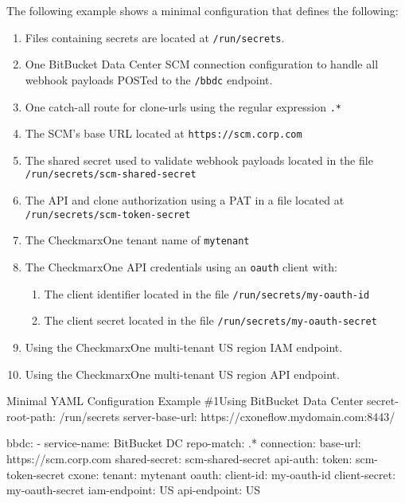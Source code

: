 The following example shows a minimal \cxoneflow configuration that defines the following:

\begin{enumerate}
    \item Files containing secrets are located at \texttt{/run/secrets}.
    \item One BitBucket Data Center SCM connection configuration to handle all webhook payloads
    POSTed to the \texttt{/bbdc} endpoint.
    \item One catch-all route for clone-urls using the regular expression \texttt{.*}
    \item The SCM's base URL located at \texttt{https://scm.corp.com}
    \item The shared secret used to validate webhook payloads located in the file \texttt{/run/secrets/scm-shared-secret}
    \item The API and clone authorization using a PAT in a file located at \texttt{/run/secrets/scm-token-secret}
    \item The CheckmarxOne tenant name of \texttt{mytenant}
    \item The CheckmarxOne API credentials using an \texttt{oauth} client with:
    \begin{enumerate}
        \item The client identifier located in the file \texttt{/run/secrets/my-oauth-id}
        \item The client secret located in the file \texttt{/run/secrets/my-oauth-secret}
    \end{enumerate}
    \item Using the CheckmarxOne multi-tenant US region IAM endpoint.
    \item Using the CheckmarxOne multi-tenant US region API endpoint.
\end{enumerate}

\begin{code}{Minimal YAML Configuration Example \#1}{Using BitBucket Data Center}{}
secret-root-path: /run/secrets
server-base-url: https://cxoneflow.mydomain.com:8443/

bbdc:
    - service-name: BitBucket DC
      repo-match: .*
      connection:
        base-url: https://scm.corp.com
        shared-secret: scm-shared-secret
        api-auth:
          token: scm-token-secret
      cxone:
        tenant: mytenant
        oauth:
          client-id: my-oauth-id
          client-secret: my-oauth-secret
        iam-endpoint: US
        api-endpoint: US
\end{code}

